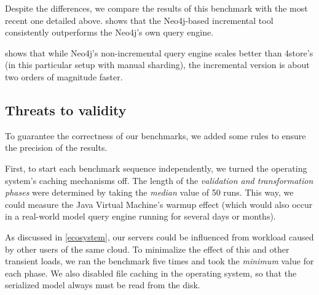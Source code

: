 Despite the differences, we compare the results of this benchmark with the most recent one detailed above.  shows that the Neo4j-based incremental tool consistently outperforms the Neo4j's own query engine.


 shows that while Neo4j's non-incremental query engine scales better than 4store's (in this particular setup with manual sharding), the incremental version is about two orders of magnitude faster.


\subsection{Threats to validity}
\label{threats-to-validity}

To guarantee the correctness of our benchmarks, we added some rules to ensure the precision of the results.

First, to start each benchmark sequence independently, we turned the operating system's caching mechanisms off. The length of the \emph{validation and transformation phases} were determined by taking the \emph{median} value of 50 runs. This way, we could measure the Java Virtual Machine's warmup effect (which would also occur in a real-world model query engine running for several days or months).

As discussed in \autoref{ecosystem}, our servers could be influenced from workload caused by other users of the same cloud. To minimalize the effect of this and other transient loads, we ran the benchmark five times and took the \emph{minimum} value for each phase. We also disabled file caching in the operating system, so that the serialized model always must be read from the disk.
